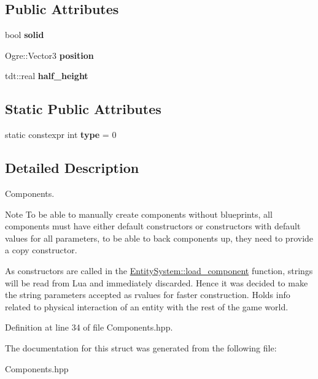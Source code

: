 \subsection*{Public Attributes}
\begin{DoxyCompactItemize}
\item 
bool {\bfseries solid}\hypertarget{struct_physics_component_a242dde7c1239f5379b3498e628bb0977}{}\label{struct_physics_component_a242dde7c1239f5379b3498e628bb0977}

\item 
Ogre\+::\+Vector3 {\bfseries position}\hypertarget{struct_physics_component_ac550fbdeaabe49e502568b002df93d02}{}\label{struct_physics_component_ac550fbdeaabe49e502568b002df93d02}

\item 
tdt\+::real {\bfseries half\+\_\+height}\hypertarget{struct_physics_component_a6336b8ed7ecfc662bc296d13fb4b9bc1}{}\label{struct_physics_component_a6336b8ed7ecfc662bc296d13fb4b9bc1}

\end{DoxyCompactItemize}
\subsection*{Static Public Attributes}
\begin{DoxyCompactItemize}
\item 
static constexpr int {\bfseries type} = 0\hypertarget{struct_physics_component_aa3503fc9f153c589bc1d355f62a36299}{}\label{struct_physics_component_aa3503fc9f153c589bc1d355f62a36299}

\end{DoxyCompactItemize}


\subsection{Detailed Description}
Components. 

\begin{DoxyNote}{Note}
To be able to manually create components without blueprints, all components must have either default constructors or constructors with default values for all parameters, to be able to back components up, they need to provide a copy constructor. 

As constructors are called in the \hyperlink{class_entity_system_ac2d122f65e967b51cc37227b5dd0a7fe}{Entity\+System\+::load\+\_\+component} function, strings will be read from Lua and immediately discarded. Hence it was decided to make the string parameters accepted as rvalues for faster construction. Holds info related to physical interaction of an entity with the rest of the game world. 
\end{DoxyNote}


Definition at line 34 of file Components.\+hpp.



The documentation for this struct was generated from the following file\+:\begin{DoxyCompactItemize}
\item 
Components.\+hpp\end{DoxyCompactItemize}
